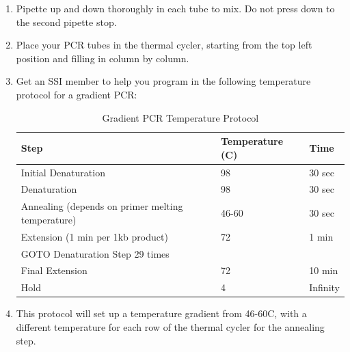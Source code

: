 \documentclass[letterpaper]{article}
\begin{document}
\begin{enumerate}
\item{Pipette up and down thoroughly in each tube to mix. Do not press down to the second pipette stop.}
\item{Place your PCR tubes in the thermal cycler, starting from the top left position and filling in column by column.}
\item{Get an SSI member to help you program in the following temperature protocol for a gradient PCR:}

\begin{table}[h!]
\centering
\caption{Gradient PCR Temperature Protocol}
\label{my-label}
\begin{tabular}{|l|l|l|}
\hline
Step                       & Temperature (C) & Time     \\ \hline
Initial Denaturation       & 98          & 30 sec   \\ \hline
Denaturation               & 98          & 30 sec   \\ \hline
Annealing (depends on primer melting temperature)                 & 46-60       & 30 sec   \\ \hline
Extension (1 min per 1kb product)                 & 72          & 1 min    \\ \hline
GOTO Denaturation Step 29 times &             &          \\ \hline
Final Extension            & 72          & 10 min   \\ \hline
Hold                       & 4           & Infinity \\ \hline
\end{tabular}
\end{table}

\item{This protocol will set up a temperature gradient from 46-60C, with a different temperature for each row of the thermal cycler for the annealing step.}
\end{enumerate}
\end{document}
